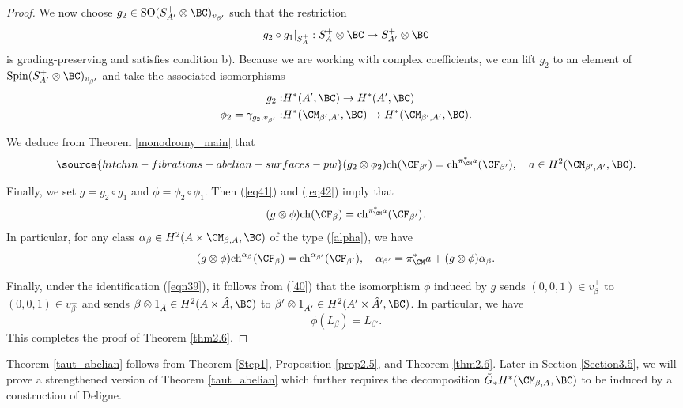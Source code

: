 \begin{proof}
We now choose $g_2 \in \mathrm{SO}(S_{A'}^+\otimes \BC)_{v_{\beta'}}$ such that the restriction
$$g_2\circ g_1|_{S_{A}^{+}}: S_{A}^{+} \otimes \BC \rightarrow S_{A'}^{+}\otimes\BC$$
is grading-preserving and satisfies condition b).
Because we are working with complex coefficients, we can lift $g_2$ to an element of
$\mathrm{Spin}(S_{A'}^{+}\otimes \BC)_{v_{\beta'}}$ and take the associated isomorphisms
\[
\begin{split}
 g_2: &  H^*(A',\BC)  \rightarrow H^*(A',\BC)
\\
\phi_2=  \gamma_{g_2,v_{\beta'}}: &   H^*(\CM_{\beta',A'},\BC)  \rightarrow H^*(\CM_{\beta',A'},\BC).
\end{split}
\]

We deduce from Theorem \ref{monodromy_main} that
\begin{equation}\label{eq42}
\source{hitchin-fibrations-abelian-surfaces-pw}
(g_2 \otimes \phi_2) \mathrm{ch}(\CF_{\beta'}) =  \mathrm{ch}^{\pi_\CM^*a}(\CF_{\beta'}), \quad a \in H^2(\CM_{\beta',A'}, \BC).
\end{equation}

Finally, we set $g = g_2 \circ g_1$ and $\phi = \phi_2\circ \phi_1$.
Then  (\ref{eq41}) and (\ref{eq42}) imply that
\[
(g\otimes \phi)\mathrm{ch}(\CF_{\beta}) = \mathrm{ch}^{\pi_\CM^*a}(\CF_{\beta'}).
\]
In particular, for any class $\alpha_\beta \in H^2(A\times \CM_{\beta,A}, \BC)$ of the type (\ref{alpha}), we have
\[
(g\otimes \phi)\mathrm{ch}^{\alpha_\beta}(\CF_{\beta}) = \mathrm{ch}^{\alpha_{\beta'}}(\CF_{\beta'}), \quad \alpha_{\beta'} = \pi_\CM^*a+ (g\otimes \phi)\alpha_\beta.
\]

Finally, under the identification (\ref{eqn39}), it follows from (\ref{40}) that the isomorphism $\phi$ induced by $g$ sends $(0,0,1) \in v_\beta^\perp$ to $(0,0,1) \in v_{\beta'}^\perp$ and sends $\beta\otimes 1_{\hat{A}} \in H^2(A\times \hat{A}, \BC)$ to $\beta' \otimes 1_{\hat{A'}} \in H^2(A'\times \hat{A'}, \BC)$. In particular, we have
\[
\phi(L_\beta) = L_{\beta'}.
\]
This completes the proof of Theorem \ref{thm2.6}.
\end{proof}

Theorem \ref{taut_abelian} follows from Theorem \ref{Step1}, Proposition \ref{prop2.5}, and Theorem \ref{thm2.6}. Later in Section \ref{Section3.5}, we will prove a strengthened version of Theorem \ref{taut_abelian} which further requires the decomposition $\tilde{G}_*H^*(\CM_{\beta,A}, \BC)$ to be induced by a construction of Deligne.

